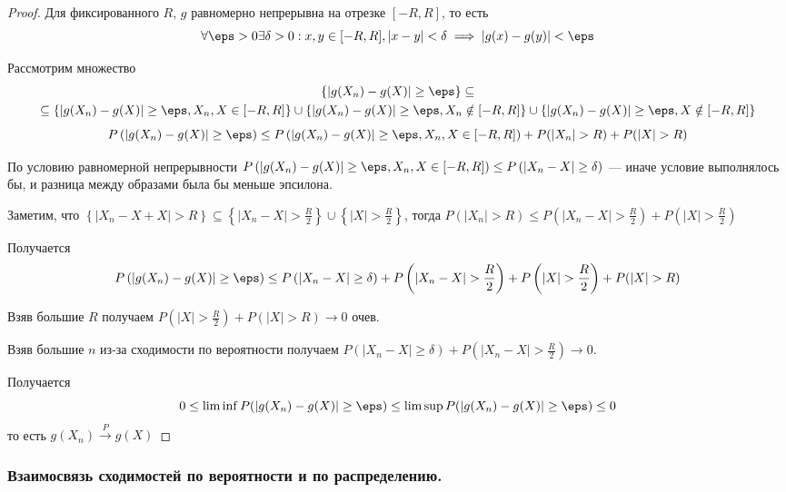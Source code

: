 \begin{proof} 
Для фиксированного $R$, $g$ равномерно непрерывна на отрезке $[-R, R]$, то есть 
\[
    \forall \eps > 0 \exists \delta > 0: x, y \in [-R, R], |x - y| < \delta \implies |g(x) - g(y)| < \eps
\]

Рассмотрим множество 
\begin{multline*} 
    \left\{ |g(X_n) - g(X) | \geq \eps \right\} \subseteq \\
    \subseteq \left\{ |g(X_n) - g(X) | \geq \eps, X_n, X \in [-R, R] \right\} \cup
    \left\{ |g(X_n) - g(X) | \geq \eps, X_n \notin [-R, R] \right\} \cup
    \left\{ |g(X_n) - g(X) | \geq \eps, X \notin [-R, R] \right\}
\end{multline*}
\[
    P \left( |g(X_n) - g(X)| \geq \eps \right) \leq P \left( |g(X_n) - g(X) | \geq \eps, X_n, X \in [-R, R] \right) + 
    P (|X_n| > R) + P(|X| > R) 
\]

По условию равномерной непрерывности 
$P \left( |g(X_n) - g(X) | \geq \eps, X_n, X \in [-R, R] \right) \leq P \left( |X_n - X| \geq \delta \right)$ 
— иначе условие выполнялось бы, и разница между образами была бы меньше эпсилона.

Заметим, что $ \left\{ |X_n - X + X| > R \right\} \subseteq 
\left\{ |X_n - X| > \frac{R}{2} \right\} \cup \left\{ |X| > \frac{R}{2} \right\}$, тогда
$P(|X_n| > R) \leq P \left( |X_n - X| > \frac{R}{2} \right) + P \left( |X| > \frac{R}{2} \right)$

Получается 
\[
    P \left( |g(X_n) - g(X) | \geq \eps \right) \leq
    P \left( |X_n - X| \geq \delta \right) + 
    P \left( |X_n - X| > \frac{R}{2} \right) + P \left( |X| > \frac{R}{2} \right) + P ( |X| > R)
\]

Взяв большие $R$ получаем $P \left( |X| > \frac{R}{2} \right) + P \left( |X| > R \right) \to 0$ очев.

Взяв большие $n$ из-за сходимости по вероятности получаем 
$P \left( |X_n - X| \geq \delta \right) + P \left( |X_n - X| > \frac{R}{2} \right) \to 0$.

Получается 
\[ 
    0 \leq \liminf P(| g(X_n) - g(X) | \geq \eps) \leq \limsup P(| g(X_n) - g(X) | \geq \eps) \leq 0
\]
то есть $g(X_n) \xrightarrow{P} g(X)$

\end{proof} 


\subsubsection{Взаимосвязь сходимостей по вероятности и по распределению.}

